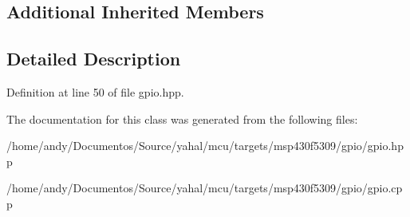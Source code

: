 \subsection*{Additional Inherited Members}


\subsection{Detailed Description}
\begin{DoxyVerb}\end{DoxyVerb}
 

Definition at line 50 of file gpio.\+hpp.



The documentation for this class was generated from the following files\+:\begin{DoxyCompactItemize}
\item 
/home/andy/\+Documentos/\+Source/yahal/mcu/targets/msp430f5309/gpio/gpio.\+hpp\item 
/home/andy/\+Documentos/\+Source/yahal/mcu/targets/msp430f5309/gpio/gpio.\+cpp\end{DoxyCompactItemize}
